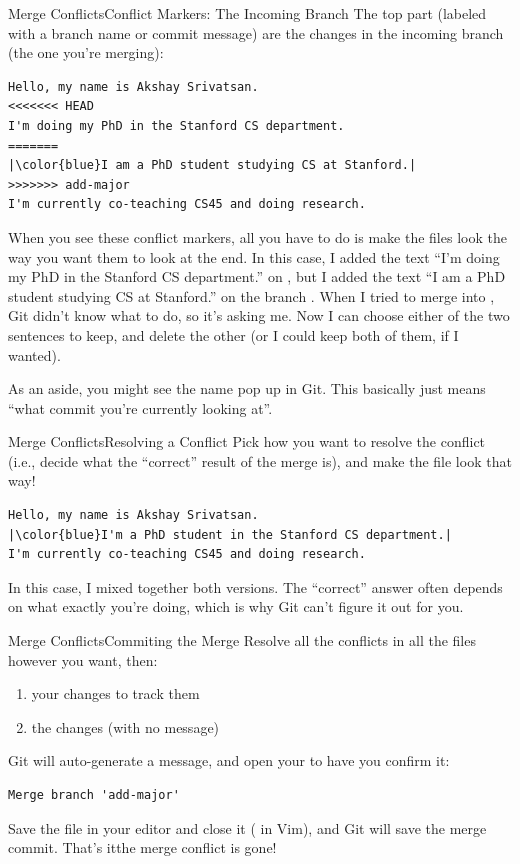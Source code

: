 \begin{frame}[fragile]{Merge Conflicts}{Conflict Markers: The Incoming Branch}
  The top part (labeled with a branch name or commit message) are the changes
  in the incoming branch (the one you're merging):
  \begin{verbatim}
Hello, my name is Akshay Srivatsan.
<<<<<<< HEAD
I'm doing my PhD in the Stanford CS department.
=======
|\color{blue}I am a PhD student studying CS at Stanford.|
>>>>>>> add-major
I'm currently co-teaching CS45 and doing research.
  \end{verbatim}
\end{frame}

When you see these conflict markers, all you have to do is make the files look
the way you want them to look at the end.  In this case, I added the text
\enquote{I'm doing my PhD in the Stanford CS department.} on , but I
added the text \enquote{I am a PhD student studying CS at Stanford.} on the
branch .  When I tried to merge  into ,
Git didn't know what to do, so it's asking me.  Now I can choose either of the
two sentences to keep, and delete the other (or I could keep both of them, if I wanted).

As an aside, you might see the name  pop up in Git.  This basically
just means \enquote{what commit you're currently looking at}.

\begin{frame}[fragile]{Merge Conflicts}{Resolving a Conflict}
  Pick how you want to resolve the conflict (i.e., decide what the \enquote{correct} result of the merge is), and make the file look that way!
  \begin{verbatim}
Hello, my name is Akshay Srivatsan.
|\color{blue}I'm a PhD student in the Stanford CS department.|
I'm currently co-teaching CS45 and doing research.
  \end{verbatim}
  In this case, I mixed together both versions.  The \enquote{correct} answer
  often depends on what exactly you're doing, which is why Git can't figure it
  out for you.
\end{frame}

\begin{frame}[fragile]{Merge Conflicts}{Commiting the Merge}
  Resolve all the conflicts in all the files however you want, then:
  \begin{enumerate}
    \item {} your changes to track them
    \item {} the changes (with no message)
  \end{enumerate}

  Git will auto-generate a message, and open your  to have you
  confirm it:
  \begin{verbatim}
Merge branch 'add-major'
  \end{verbatim}
  Save the file in your editor and close it ( in Vim), and Git will
  save the merge commit.  That's it\textemdash{}the merge conflict is gone!
\end{frame}

